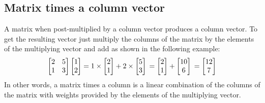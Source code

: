 \documentclass[../main.tex]{subfiles}
\begin{document}
\begin{multicols*}{4}
{    \subsection{Matrix times a column vector}
    A matrix when post-multiplied by a column vector produces a column vector. To get the resulting vector just multiply the columns of the matrix by the elements of the multiplying vector and add as shown in the following example:
    \[
        \begin{bmatrix}
            2 & 5 \\
            1 & 3
        \end{bmatrix}
        \begin{bmatrix}
            1 \\
            2
        \end{bmatrix}
        =
        1 \times
        \begin{bmatrix}
            2 \\
            1
        \end{bmatrix}
        +
        2 \times
        \begin{bmatrix}
            5 \\
            3
        \end{bmatrix} \\
        =
        \begin{bmatrix}
            2 \\
            1
        \end{bmatrix}
        +
        \begin{bmatrix}
            10 \\
            6
        \end{bmatrix}\\
        =
        \begin{bmatrix}
            12 \\
            7
        \end{bmatrix}
    \]
    In other words, a matrix times a column is a linear combination of the columns of the matrix with weights provided by the elements of the multiplying vector.
}

\end{multicols*}

\end{document}
